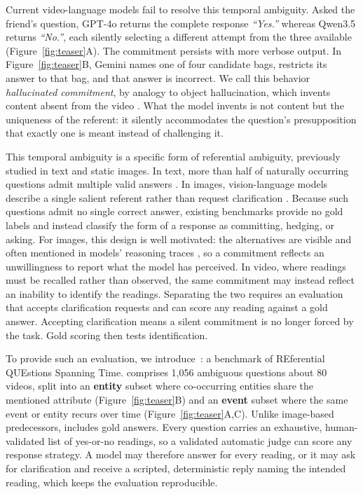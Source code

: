 Current video-language models fail to resolve this temporal ambiguity. Asked the friend's question, GPT-4o returns the complete response \textit{``Yes.''} whereas Qwen3.5 returns \textit{``No.''}, each silently selecting a different attempt from the three available (Figure~\ref{fig:teaser}A). The commitment persists with more verbose output. In Figure~\ref{fig:teaser}B, Gemini names one of four candidate bags, restricts its answer to that bag, and that answer is incorrect. We call this behavior \textit{hallucinated commitment}, by analogy to object hallucination, which invents content absent from the video \citep{rohrbach2018object}. What the model invents is not content but the uniqueness of the referent: it silently accommodates the question's presupposition that exactly one is meant \citep{lewis1979scorekeeping} instead of challenging it.

This temporal ambiguity is a specific form of referential ambiguity, previously studied in text and static images. In text, more than half of naturally occurring questions admit multiple valid answers \citep{min2020ambigqa,stengeleskin2023chicken}. In images, vision-language models describe a single salient referent \citep{testoni2025racquet} rather than request clarification \citep{jian2025clearvqa,wang2025mucar}. Because such questions admit no single correct answer, existing benchmarks provide no gold labels and instead classify the form of a response as committing, hedging, or asking. For images, this design is well motivated: the alternatives are visible and often mentioned in models' reasoning traces \citep{testoni2025racquet}, so a commitment reflects an unwillingness to report what the model has perceived. In video, where readings must be recalled rather than observed, the same commitment may instead reflect an inability to identify the readings. Separating the two requires an evaluation that accepts clarification requests and can score any reading against a gold answer. Accepting clarification means a silent commitment is no longer forced by the task. Gold scoring then tests identification.

To provide such an evaluation, we introduce \bench{}\,\benchicon{}: a benchmark of REferential QUEstions Spanning Time. \bench{} comprises 1{,}056 ambiguous questions about 80 videos, split into an \textbf{entity} subset where co-occurring entities share the mentioned attribute (Figure~\ref{fig:teaser}B) and an \textbf{event} subset where the same event or entity recurs over time (Figure~\ref{fig:teaser}A,C). Unlike image-based predecessors, \bench{} includes gold answers. Every question carries an exhaustive, human-validated list of yes-or-no readings, so a validated automatic judge can score any response strategy. A model may therefore answer for every reading, or it may ask for clarification and receive a scripted, deterministic reply naming the intended reading, which keeps the evaluation reproducible.

